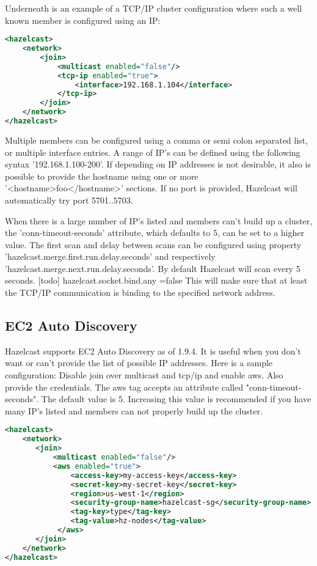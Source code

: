 Underneath is an example of a TCP/IP cluster configuration where such a well known member is configured using an IP:
\begin{lstlisting}[language=xml]
<hazelcast>
    <network>
        <join>
            <multicast enabled="false"/>
            <tcp-ip enabled="true">
                <interface>192.168.1.104</interface> 
            </tcp-ip>
        </join>
    </network>
</hazelcast>
\end{lstlisting}
Multiple members can be configured using a comma or semi colon separated list, or multiple interface entries. A range of IP's can be defined using the following syntax '192.168.1.100-200'. If depending on IP addresses is not desirable, it also is possible to provide the hostname using one or more '<hostname>foo</hostname>' sections. If no port is provided, Hazelcast will automatically try port 5701..5703. 

When there is a large number of IP's listed and members can't build up a cluster, the 'conn-timeout-seconds' attribute, which defaults to 5, can be set to a higher value. The first scan and delay between scans can be configured using property 'hazelcast.merge.first.run.delay.seconds' and respectively 'hazelcast.merge.next.run.delay.seconds'. By default Hazelcast will scan every 5 seconds.
[todo]
hazelcast.socket.bind.any =false
This will make sure that at least the TCP/IP communication is binding to the specified network address.

\subsection{EC2 Auto Discovery}

Hazelcast supports EC2 Auto Discovery as of 1.9.4. It is useful when you don't want or can't provide the list of possible IP addresses. Here is a sample configuration: Disable join over multicast and tcp/ip and enable aws. Also provide the credentials. The aws tag accepts an attribute called "conn-timeout-seconds". The default value is 5. Increasing this value is recommended if you have many IP's listed and members can not properly build up the cluster.

\begin{lstlisting}[language=xml]
<hazelcast>
    <network>
       <join>
           <multicast enabled="false"/>
           <aws enabled="true">
               <access-key>my-access-key</access-key>
               <secret-key>my-secret-key</secret-key>
               <region>us-west-1</region>                              <!-- optional, default is us-east-1 -->
               <security-group-name>hazelcast-sg</security-group-name> <!-- optional -->
               <tag-key>type</tag-key>                                  <!-- optional -->
               <tag-value>hz-nodes</tag-value>                          <!-- optional -->
            </aws>
       </join>
    </network>
</hazelcast>
\end{lstlisting}

